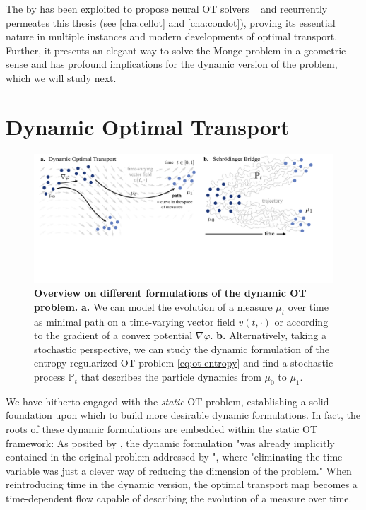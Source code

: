 The  by \citet{brenier1987decomposition, brenier1991polar} has been exploited to propose neural OT solvers ~\citep{taghvaei20192, makkuva2020optimal, korotin2021wasserstein, bunne2022proximal, alvarez2021optimizing, mokrov2021large, amos2023amortizing} and recurrently permeates this thesis (see  \cref{cha:cellot} and \ref{cha:condot}), proving its essential nature in multiple instances and modern developments of optimal transport.
Further, it presents an elegant way to solve the Monge problem in a geometric sense and has profound implications for the dynamic version of the problem, which we will study next.


\section{Dynamic Optimal Transport} \label{sec:background_ot_dynamic}

\begin{figure}[t]
  \includegraphics[width=\textwidth]{figures/fig_dynamic_ot_background.pdf}
  \caption{ \textbf{Overview on different formulations of the dynamic OT problem.} \textbf{a.} We can model the evolution of a measure $\mu_t$ over time as minimal path on a time-varying vector field $v(t, \cdot)$ or according to the gradient of a convex potential $\nabla \varphi$. \textbf{b.} Alternatively, taking a stochastic perspective, we can study the dynamic formulation of the entropy-regularized \acrshort{OT} problem \eqref{eq:ot-entropy} and find a stochastic process $\mathbb{P}_t$ that describes the particle dynamics from $\mu_0$ to $\mu_1$.}	
  \label{fig:dynamic_ot_background}
\end{figure}

We have hitherto engaged with the \emph{static} \acrlong{OT} problem, establishing a solid foundation upon which to build more desirable dynamic formulations. In fact, the roots of these dynamic formulations are embedded within the static \acrshort{OT} framework: As posited by \citet{benamou2000computational}, the dynamic formulation "was already implicitly contained in the original problem addressed by \citeauthor{monge1781histoire}", where "eliminating the time variable was just a clever way of reducing the dimension of the problem." When reintroducing time in the dynamic version, the optimal transport map becomes a time-dependent flow capable of describing the evolution of a measure over time.

